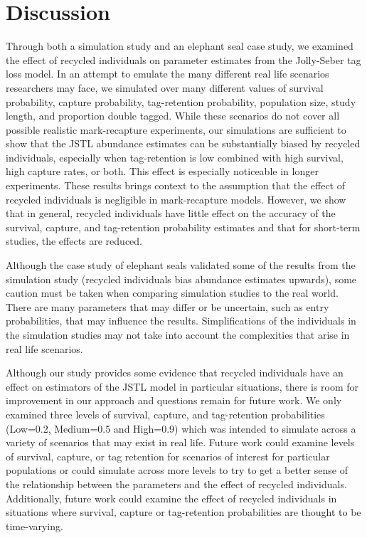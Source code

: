 \documentclass[]{article}
\begin{document}
\section{Discussion}\label{discussion}
Through both a simulation study and an elephant seal case study, we examined the effect of recycled individuals on parameter estimates from the Jolly-Seber tag loss model.
In an attempt to emulate the many different real life scenarios
researchers may face, we simulated over many different values of
survival probability, capture probability, tag-retention probability, population size, study length, and proportion double tagged. While
these scenarios do not cover all possible realistic mark-recapture
experiments, our simulations are sufficient to show that the JSTL
abundance estimates can be substantially biased by recycled individuals,
especially when tag-retention is low combined with high survival, high
capture rates, or both. This effect is especially noticeable in longer
experiments. These results brings context to the assumption that the effect of
recycled individuals is negligible in mark-recapture models. However, we
show that in general, recycled individuals have little effect on the
accuracy of the survival, capture, and tag-retention probability
estimates and that for short-term studies, the effects are reduced.

Although the case study of elephant seals validated some of the results from
the simulation study (recycled individuals bias abundance estimates
upwards), some caution must be taken when comparing simulation studies
to the real world. There are many parameters that may differ or be
uncertain, such as entry probabilities, that may influence the results.
Simplifications of the individuals in the simulation studies may not
take into account the complexities that arise in real life
scenarios.

Although our study provides some evidence that recycled individuals have
an effect on estimators of the JSTL model in particular situations,
there is room for improvement in our approach and questions remain for
future work. We only examined three levels of survival, capture, and
tag-retention probabilities (Low=0.2, Medium=0.5 and High=0.9) which was
intended to simulate across a variety of scenarios that may exist
in real life. Future work could examine levels of survival, capture, or
tag retention for scenarios of interest for particular populations or
could simulate across more levels to try to get a better sense of the
relationship between the parameters and the effect of recycled
individuals. Additionally, future work could examine the effect of
recycled individuals in situations where survival, capture or
tag-retention probabilities are thought to be time-varying.
\end{document}
